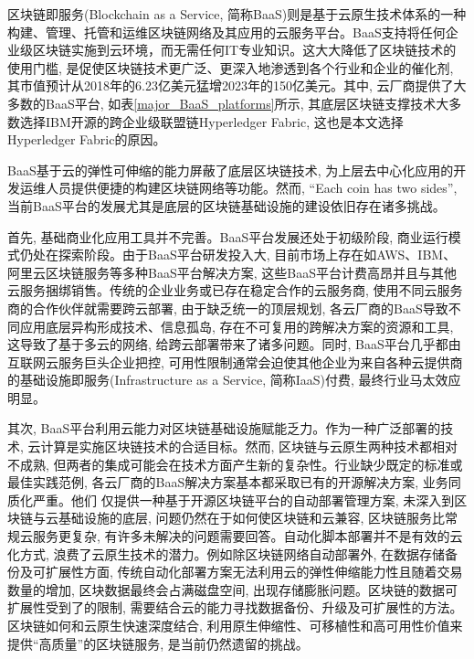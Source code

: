 区块链即服务(Blockchain as a Service, 简称BaaS)则是基于云原生技术体系的一种构建、管理、托管和运维区块链网络及其应用的云服务平台\cite{onik2019performance}。BaaS支持将任何企业级区块链实施到云环境，而无需任何IT专业知识。这大大降低了区块链技术的使用门槛, 是促使区块链技术更广泛、更深入地渗透到各个行业和企业的催化剂, 其市值预计从2018年的6.23亿美元猛增2023年的150亿美元\footnotemark[1]。其中, 云厂商提供了大多数的BaaS平台\cite{KuernetesbasedFabricChaincodeManagementAndHihgAvailabilityTechnology}, 如表\ref{major_BaaS_platforms}所示, 其底层区块链支撑技术大多数选择IBM开源的跨企业级联盟链Hyperledger Fabric, 这也是本文选择Hyperledger Fabric的原因。


BaaS基于云的弹性可伸缩的能力屏蔽了底层区块链技术, 为上层去中心化应用的开发运维人员提供便捷的构建区块链网络等功能。然而, “Each coin has two sides”, 当前BaaS平台的发展尤其是底层的区块链基础设施的建设依旧存在诸多挑战。

首先, 基础商业化应用工具并不完善\footnotemark[2]。BaaS平台发展还处于初级阶段, 商业运行模式仍处在探索阶段。由于BaaS平台研发投入大, 目前市场上存在如AWS、IBM、阿里云区块链服务等多种BaaS平台解决方案, 这些BaaS平台计费高昂\footnotemark[3]并且与其他云服务捆绑销售。传统的企业业务或已存在稳定合作的云服务商, 使用不同云服务商的合作伙伴就需要跨云部署, 由于缺乏统一的顶层规划, 各云厂商的BaaS导致不同应用底层异构形成技术、信息孤岛, 存在不可复用的跨解决方案的资源和工具, 这导致了基于多云的网络\cite{DBLP:conf/coins/GerritsKKFV21}, 给跨云部署带来了诸多问题。同时, BaaS平台几乎都由互联网云服务巨头企业把控, 可用性限制通常会迫使其他企业为来自各种云提供商的基础设施即服务(Infrastructure as a Service, 简称IaaS)付费, 最终行业马太效应明显\cite{KuernetesbasedFabricChaincodeManagementAndHihgAvailabilityTechnology}。

其次, BaaS平台利用云能力对区块链基础设施赋能乏力。作为一种广泛部署的技术, 云计算是实施区块链技术的合适目标。然而, 区块链与云原生两种技术都相对不成熟, 但两者的集成可能会在技术方面产生新的复杂性\cite{onik2019performance}。行业缺少既定的标准或最佳实践范例, 各云厂商的BaaS解决方案基本都采取已有的开源解决方案, 业务同质化严重。他们 仅提供一种基于开源区块链平台的自动部署管理方案, 未深入到区块链与云基础设施的底层, 问题仍然在于如何使区块链和云兼容\cite{gai2020blockchain}, 区块链服务比常规云服务更复杂, 有许多未解决的问题需要回答。自动化脚本部署并不是有效的云化方式, 浪费了云原生技术的潜力。例如除区块链网络自动部署外, 在数据存储备份及可扩展性方面, 传统自动化部署方案无法利用云的弹性伸缩能力性且随着交易数量的增加, 区块数据最终会占满磁盘空间, 出现存储膨胀问题。区块链的数据可扩展性受到了的限制, 需要结合云的能力寻找数据备份、升级及可扩展性的方法。区块链如何和云原生快速深度结合, 利用原生伸缩性、可移植性和高可用性价值来提供“高质量”的区块链服务, 是当前仍然遗留的挑战。

